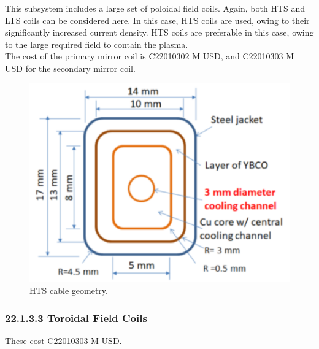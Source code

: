 This subsystem includes a large set of poloidal field coils. Again, both HTS and LTS coils can be considered here. In this case, HTS coils are used, owing to their significantly increased current density. HTS coils are preferable in this case, owing to the large required field to contain the plasma.  \\

The cost of the primary mirror coil is C22010302 M USD, and C22010303 M USD for the secondary mirror coil. \\


\begin{figure}[h]
    \centering
    \includegraphics[width =0.5\linewidth]{StandardFigures/yuhu_cs.pdf}
    \caption{HTS cable geometry.}
    \label{fig:yuhu_cs}
\end{figure}

\subsubsection*{22.1.3.3 Toroidal Field Coils}

These cost C22010303 M USD.\\

